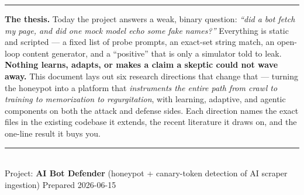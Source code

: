 \documentclass[11pt]{article}
\begin{document}
\thispagestyle{empty}

\vspace{0.7cm}

\vspace{1.7cm}

\vspace{8pt}

\vspace{6pt}
\noindent\textcolor{accent!45}{\rule{\linewidth}{1.2pt}}

\vspace{14pt}
\begin{tcolorbox}[enhanced,colback=paper,colframe=ink!20,boxrule=0.7pt,arc=3pt,
  left=12pt,right=12pt,top=9pt,bottom=9pt]
\small
\textbf{The thesis.} Today the project answers a weak, binary question: \emph{``did a bot fetch
my page, and did one \textnormal{mock} model echo some fake names?''} Everything is static and
scripted --- a fixed list of probe prompts, an exact-set string match, an open-loop content
generator, and a ``positive'' that is only a simulator told to leak. \textbf{Nothing learns,
adapts, or makes a claim a skeptic could not wave away.} This document lays out six research
directions that change that --- turning the honeypot into a platform that \emph{instruments the
entire path from crawl to training to memorization to regurgitation}, with learning, adaptive,
and agentic components on both the attack and defense sides. Each direction names the exact files
in the existing codebase it extends, the recent literature it draws on, and the one-line result it
buys you.
\end{tcolorbox}

\vfill
\noindent\textcolor{ink!20}{\rule{\linewidth}{0.6pt}}\\[4pt]
{\sffamily\footnotesize\color{ink!65}
Project: \textbf{AI Bot Defender} (honeypot + canary-token detection of AI scraper ingestion)
\hfill Prepared 2026-06-15}
\end{document}
